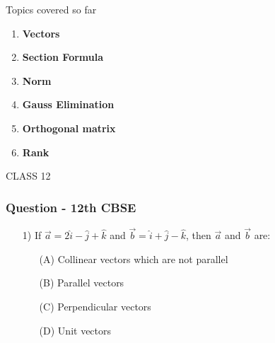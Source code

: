 \documentclass{beamer}
\begin{document}
\begin{frame}{Topics covered so far}
    \begin{enumerate}
        \item \textbf{Vectors}
        \item \textbf{Section Formula}
        \item \textbf{Norm}
        \item \textbf{Gauss Elimination}
        \item \textbf{Orthogonal matrix}
        \item \textbf{Rank}
    \end{enumerate}
\end{frame}


\begin{frame}[standout]
    CLASS 12
\end{frame}








\begin{frame}
\frametitle{Question - 12th CBSE}
\begin{enumerate}
    \item [1)]
If $\overrightarrow{a} = 2\hat{i} - \hat{j} + \hat{k}$ and  $\overrightarrow{b} = \hat{i} + \hat{j} - \hat{k}$, then $\overrightarrow{a}$ and $\overrightarrow{b}$ are:
    \begin{enumerate}
\item [(A)] Collinear vectors which are not parallel
\item [(B)] Parallel vectors
\item [(C)] Perpendicular vectors
\item [(D)] Unit vectors
\end{enumerate}
\end{enumerate}
    
\end{frame}
\end{document}
